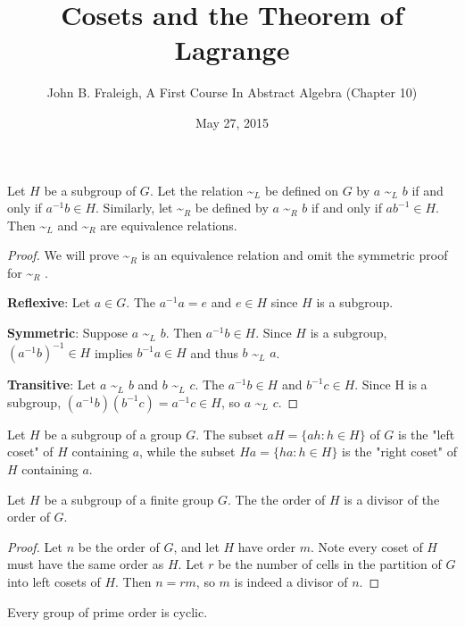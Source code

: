 \documentclass[a4paper,11pt]{article}
\title{Cosets and the Theorem of Lagrange}
\author{John B. Fraleigh, A First Course In Abstract Algebra (Chapter 10)}
\date{May 27, 2015}
\newcommand{\lowtilde}[1] {
  \textasciitilde{}\(_{#1}\)
}
\begin{document}
\maketitle
{}

\begin{outline}

    Let \(H\) be a subgroup of \(G\). Let the relation\lowtilde{L}be defined on \(G\) 
    by \(a\)\lowtilde{L}\(b\) if and only if \(a^{-1}b \in H\). Similarly, let\lowtilde{R}be defined 
    by \(a\)\lowtilde{R}\(b\) if and only if \(ab^{-1} \in H\). Then\lowtilde{L}and\lowtilde{R}are 
    equivalence relations.
    
    \begin{proof}
      We will prove\lowtilde{R}is an equivalence relation and omit the symmetric proof for\lowtilde{R}.
      
      \textbf{Reflexive}: Let \(a \in G\). The \(a^{-1}a = e\) and \(e \in H\) since \(H\) is a subgroup.
      
      \textbf{Symmetric}: Suppose \(a\)\lowtilde{L}\(b\). Then \(a^{-1}b \in H\). Since \(H\) is a subgroup,
      \((a^{-1}b)^{-1} \in H\) implies \(b^{-1}a \in H\) and thus \(b\)\lowtilde{L}\(a\).
      
      \textbf{Transitive}: Let \(a\)\lowtilde{L}\(b\) and \(b\)\lowtilde{L}\(c\). The \(a^{-1}b \in H\) 
      and \(b^{-1}c \in H\). Since H is a subgroup, \((a^{-1}b)(b^{-1}c) = a^{-1}c \in H\), so 
      \(a\)\lowtilde{L}\(c\).
    \end{proof}
    
    Let \(H\) be a subgroup of a group \(G\). The subset \(aH = \{ah : h \in H\}\) of \(G\)
    is the "left coset" of \(H\) containing \(a\), while the subset \(Ha = \{ha : h \in H\}\) is the "right
    coset" of \(H\) containing \(a\).
    
    Let \(H\) be a subgroup of a finite group \(G\). The the order of \(H\) is a divisor of the order of \(G\).
    
    \begin{proof}
      Let \(n\) be the order of \(G\), and let \(H\) have order \(m\). Note every coset of \(H\) must have
      the same order as \(H\). Let \(r\) be the number of cells in the partition of \(G\) into left cosets of
      \(H\). Then \(n = rm\), so \(m\) is indeed a divisor of \(n\).
    \end{proof}
    
    Every group of prime order is cyclic.
    

\end{outline}
\end{document}
